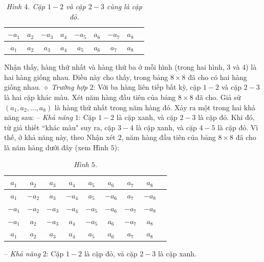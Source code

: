 \begin{multicols}{2}
\begin{table}[H]
\begin{tabular}{|c|c|c|c|c|c|c|c|c|}
			\hline
			$-a_1$ & $a_2$ & $-a_3$ & $a_4$ & $-a_5$ & $a_6$ & $-a_7$ & $a_8$ \\
			\hline
			$a_1$ & $a_2$ & $a_3$ & $a_4$ & $a_5$ & $a_6$ & $a_7$ & $a_8$ \\
			\hline
		\end{tabular}
		\caption{\small\textit{\color{thachthuctoanhoc}Hình $4$. Cặp $1 - 2$ và cặp $2 - 3$ cùng là cặp đỏ.}}
		\vspace*{-10pt}
	\end{table}
	Nhận thấy, hàng thứ nhất và hàng thứ ba ở mỗi hình (trong hai hình, $3$ và $4$) là hai hàng giống nhau. Điều này cho thấy, trong bảng $8 \times 8$ đã cho có hai hàng giống nhau.
	\vskip 0.05cm
	$\diamond$ \textit{Trường hợp} $2$: Với ba hàng liên tiếp bất kỳ, cặp $1 - 2$ và cặp $2 - 3$ là hai cặp khác màu.
	\vskip 0.05cm
	Xét năm hàng đầu tiên của bảng $8 \times  8$ đã cho.
	\vskip 0.05cm
	Giả sử $\left( {{a_1},{a_2}, \ldots ,{a_8}} \right)$ là hàng thứ nhất trong năm hàng đó.
	\vskip 0.05cm
	Xảy ra một trong hai khả năng sau:
	\vskip 0.05cm
	-- \textit{Khả năng} $1$: Cặp $1 - 2$ là cặp xanh, và cặp $2 - 3$ là cặp đỏ.
	\vskip 0.05cm
	Khi đó, từ giả thiết ``khác màu" suy ra, cặp $3 - 4$ là cặp xanh, và cặp $4 - 5$ là cặp đỏ.
	\vskip 0.05cm
	Vì thế, ở khả năng này, theo Nhận xét $2$, năm hàng đầu tiên của bảng $8 \times  8$ đã cho là năm hàng dưới đây (xem Hình $5$):
	\begin{table}[H]
		\vspace*{-5pt}
		\centering
		\captionsetup{labelformat= empty, justification=centering}
		\renewcommand{\arraystretch}{1.2}
		\setlength{\tabcolsep}{2pt}
		\begin{tabular}{|c|c|c|c|c|c|c|c|c|}
			\hline
			$a_1$ & $a_2$ & $a_3$ & $a_4$ & $a_5$ & $a_6$ & $a_7$ & $a_8$ \\
			\hline
			$a_1$ & $-a_2$ & $a_3$ & $-a_4$ & $a_5$ & $-a_6$ & $a_7$ & $-a_8$ \\
			\hline
			$-a_1$ & $-a_2$ & $-a_3$ & $-a_4$ & $-a_5$ & $-a_6$ & $-a_7$ & $-a_8$ \\
			\hline
			$-a_1$ & $a_2$ & $-a_3$ & $a_4$ & $-a_5$ & $a_6$ & $-a_7$ & $a_8$ \\
			\hline
			$a_1$ & $a_2$ & $a_3$ & $a_4$ & $a_5$ & $a_6$ & $a_7$ & $a_8$ \\
			\hline
		\end{tabular}
		\caption{\small\textit{\color{thachthuctoanhoc}Hình $5$.}}
		\vspace*{-10pt}
	\end{table}
	-- \textit{Khả năng} $2$: Cặp $1 - 2$ là cặp đỏ, và cặp $2 - 3$ là cặp xanh.

\end{multicols}
